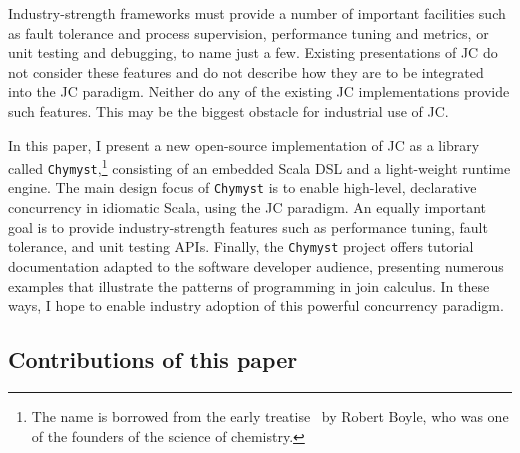 \documentclass[sigplan,10pt,review,anonymous]{acmart}\settopmatter{printfolios=true}
\begin{document}
Industry-strength frameworks must provide a number of important facilities
such as fault tolerance
and process supervision, performance tuning and metrics,
or unit testing and debugging, to name just a few. Existing
presentations of JC do not consider these features and do not describe
how they are to be integrated into the JC paradigm. Neither do any
of the existing JC implementations provide such features. This may
be the biggest obstacle for industrial use of JC.

In this paper, I present a new open-source implementation of JC as
a library called \texttt{Chymyst},\footnote{ The name is borrowed from the early treatise~\citep{Boy1661} by
Robert Boyle, who was one of the founders of the science of chemistry.} consisting of an embedded Scala DSL and a light-weight runtime engine.
The main design focus of \texttt{Chymyst} is to enable high-level,
declarative concurrency in idiomatic Scala, using the JC paradigm.
An equally important goal is to provide industry-strength features
such as performance tuning, fault tolerance, and unit testing APIs.
Finally, the \texttt{Chymyst} project offers tutorial documentation
adapted to the software developer audience, presenting numerous examples
that illustrate the patterns of programming in join calculus. In these
ways, I hope to enable industry adoption of this powerful concurrency
paradigm.

\subsection{Contributions of this paper}
\end{document}
